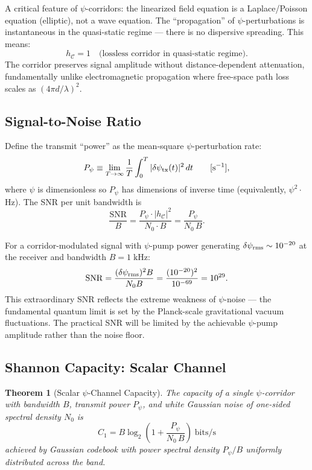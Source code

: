 \documentclass[twocolumn,superscriptaddress,prd,nofootinbib]{revtex4-2}
\newcommand{\SNR}{\mathrm{SNR}}
\newcommand{\Corridor}{\mathcal{C}}
\newtheorem{theorem}{Theorem}
\begin{document}
A critical feature of $\psi$-corridors: the linearized field equation
is a Laplace/Poisson equation (elliptic), not a wave equation. The
``propagation'' of $\psi$-perturbations is instantaneous in the
quasi-static regime --- there is no dispersive spreading. This means:
\begin{equation}
h_\Corridor = 1\quad\text{(lossless corridor in quasi-static regime)}.
\label{eq:lossless}
\end{equation}
The corridor preserves signal amplitude without distance-dependent
attenuation, fundamentally unlike electromagnetic propagation where
free-space path loss scales as $(4\pi d/\lambda)^2$.

\subsection{Signal-to-Noise Ratio}

Define the transmit ``power'' as the mean-square $\psi$-perturbation rate:
\begin{equation}
P_\psi \equiv \lim_{T\to\infty}\frac{1}{T}\int_0^T
|\delta\psi_{\rm tx}(t)|^2\,dt \qquad [\text{s}^{-1}],
\end{equation}
where $\psi$ is dimensionless so $P_\psi$ has dimensions of inverse time
(equivalently, $\psi^2\cdot$Hz). The SNR per unit bandwidth is
\begin{equation}
\frac{\SNR}{B} = \frac{P_\psi \cdot |h_\Corridor|^2}{N_0 \cdot B}
= \frac{P_\psi}{N_0\,B}.
\label{eq:SNR-def}
\end{equation}

For a corridor-modulated signal with $\psi$-pump power generating
$\delta\psi_{\rm rms} \sim 10^{-20}$ at the receiver and bandwidth
$B = 1\;\text{kHz}$:
\begin{equation}
\SNR = \frac{(\delta\psi_{\rm rms})^2 B}{N_0 B}
= \frac{(10^{-20})^2}{10^{-69}} = 10^{29}.
\label{eq:SNR-numerical}
\end{equation}
This extraordinary SNR reflects the extreme weakness of $\psi$-noise
--- the fundamental quantum limit is set by the Planck-scale
gravitational vacuum fluctuations. The practical SNR will be limited
by the achievable $\psi$-pump amplitude rather than the noise floor.

\subsection{Shannon Capacity: Scalar Channel}

\begin{theorem}[Scalar $\psi$-Channel Capacity]\label{thm:scalar-capacity}
The capacity of a single $\psi$-corridor with bandwidth $B$, transmit
power $P_\psi$, and white Gaussian noise of one-sided spectral density
$N_0$ is
\begin{equation}
\boxed{
C_1 = B\log_2\!\left(1 + \frac{P_\psi}{N_0\,B}\right)
\;\text{bits/s}
}
\label{eq:C1}
\end{equation}
achieved by Gaussian codebook with power spectral density $P_\psi/B$
uniformly distributed across the band.
\end{theorem}
\end{document}
